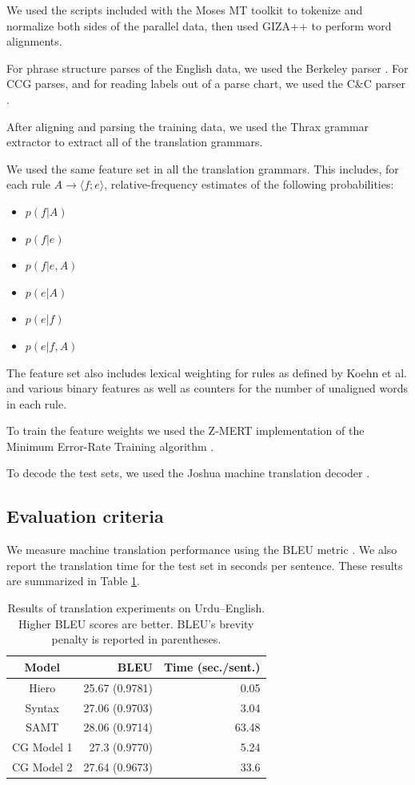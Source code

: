 \documentclass{article}
\begin{document}
We used the scripts included with the Moses MT toolkit \cite{moses} to tokenize and normalize both sides of the parallel data, then used GIZA++ \cite{giza} to perform word alignments.

For phrase structure parses of the English data, we used the Berkeley parser \cite{berkeley}. For CCG parses, and for reading labels out of a parse chart, we used the C\&C parser \cite{candc}.

After aligning and parsing the training data, we used the Thrax grammar extractor \cite{joshua3} to extract all of the translation grammars.

We used the same feature set in all the translation grammars. This includes, for each rule $A \to \langle f ; e \rangle$, relative-frequency estimates of the following probabilities:
\begin{itemize}
\item $p(f|A)$
\item $p(f|e)$
\item $p(f|e,A)$
\item $p(e|A)$
\item $p(e|f)$
\item $p(e|f,A)$
\end{itemize}
The feature set also includes lexical weighting for rules as defined by Koehn et al.  and various binary features as well as counters for the number of unaligned words in each rule.

To train the feature weights we used the Z-MERT implementation \cite{zmert} of the Minimum Error-Rate Training algorithm \cite{mert}.

To decode the test sets, we used the Joshua machine translation decoder \cite{joshua3}.

\subsection{Evaluation criteria}

We measure machine translation performance using the BLEU metric \cite{papineni-bleu}. We also report the translation time for the test set in seconds per sentence. These results are summarized in Table \ref{table:results}.

\begin{table}
\centering
\begin{tabular}{|c|r|r|}
\hline
Model & BLEU & Time (sec./sent.) \\
\hline
Hiero & 25.67 (0.9781) & 0.05 \\
Syntax & 27.06 (0.9703) & 3.04 \\
SAMT & 28.06 (0.9714) & 63.48 \\
CG Model 1 & 27.3 (0.9770) & 5.24 \\
CG Model 2 & 27.64 (0.9673) & 33.6 \\
\hline
\end{tabular}
\caption{Results of translation experiments on Urdu--English. Higher BLEU scores are better. BLEU's brevity penalty is reported in parentheses.\label{table:results}}
\end{table}
\end{document}
